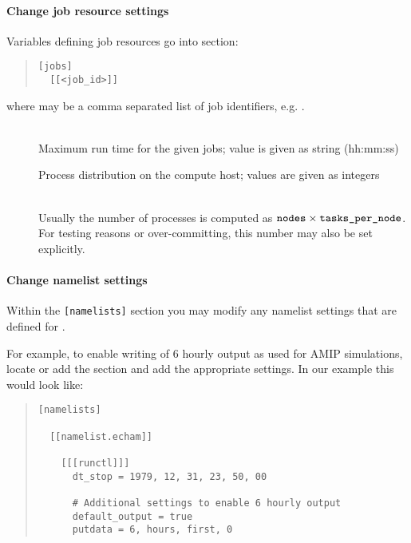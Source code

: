 \paragraph*{Change job resource settings}

Variables defining job resources go into section:

\begin{quote}
\begin{verbatim}
[jobs]
  [[<job_id>]]
\end{verbatim}
\end{quote}

where  may be a comma separated list of job identifiers,
e.g. .

\begin{description}

\item[]\leavevmode\\
  Maximum run time for the given jobs; value is given as string (hh:mm:ss)

\item[{\parbox[b]{\linewidth}{
  \code{nodes}\\
  \code{tasks\_per\_node}\\
  \code{threads\_per\_task}
}}]
  Process distribution on the compute host; values are given as integers

\item[]\leavevmode\\
  Usually the number of processes is computed as
  $\texttt{nodes}\times\texttt{tasks\_per\_node}$. For testing reasons or
  over-committing, this number may also be set explicitly.

\end{description}

\paragraph*{Change namelist settings}

Within the \texttt{{[}namelists{]}} section you may modify any namelist
settings that are defined for \echam{}.

For example, to enable writing of 6 hourly output as used for AMIP simulations,
locate or add the  section and add the
appropriate settings. In our  example this would look
like:

\begin{quote}
\begin{verbatim}
[namelists]

  [[namelist.echam]]

    [[[runctl]]]
      dt_stop = 1979, 12, 31, 23, 50, 00

      # Additional settings to enable 6 hourly output
      default_output = true
      putdata = 6, hours, first, 0
\end{verbatim}
\end{quote}

